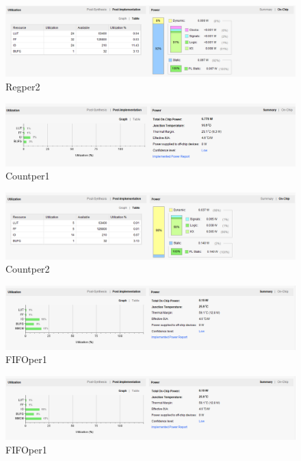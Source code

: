 \documentclass[12pt, a4paper]{article}
\begin{document}
\begin{figure}[H]
	\centering
	\includegraphics[width=0.9\linewidth]{Regper2}
	\caption{Regper2}
	\label{fig:Regper2}
\end{figure}

\begin{figure}[H]
	\centering
	\includegraphics[width=0.9\linewidth]{Countper1}
	\caption{Countper1}
	\label{fig:Countper1}
\end{figure}

\begin{figure}[H]
	\centering
	\includegraphics[width=0.9\linewidth]{Countper2}
	\caption{Countper2}
	\label{fig:Countper2}
\end{figure}

\begin{figure}[H]
	\centering
	\includegraphics[width=0.9\linewidth]{FIFOper1}
	\caption{FIFOper1}
	\label{fig:FIFOper1}
\end{figure}

\begin{figure}[H]
	\centering
	\includegraphics[width=0.9\linewidth]{FIFOper1}
	\caption{FIFOper1}
	\label{fig:FIFOper1}
\end{figure}
\clearpage
\end{document}

